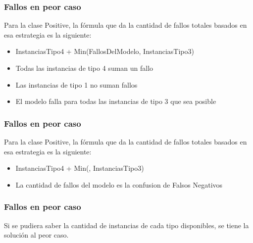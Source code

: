 \begin{frame}[t]
\frametitle{Fallos en peor caso}
\vspace{6mm}
Para la clase Positive, la f\'ormula que da la cantidad de fallos totales basados en esa estrategia es la siguiente:
\vspace{3mm}
\begin{itemize}
    \item InstanciasTipo4 + Min(FallosDelModelo, InstanciasTipo3)
\end{itemize}
\vspace{3mm}
\begin{itemize}
    \item Todas las instancias de tipo 4 suman un fallo
    \item Las instancias de tipo 1 no suman fallos
    \item El modelo falla para todas las instancias de tipo 3 que sea posible
\end{itemize}
\end{frame}



\begin{frame}[t]
\frametitle{Fallos en peor caso}
\vspace{6mm}
Para la clase Positive, la f\'ormula que da la cantidad de fallos totales basados en esa estrategia es la siguiente:
\vspace{3mm}
\begin{itemize}
    \item InstanciasTipo4 + Min(\MFN, InstanciasTipo3)
\end{itemize}
\vspace{3mm}
\begin{itemize}
\item La cantidad de fallos del modelo es la confusion de Falsos Negativos
\end{itemize}
\end{frame}



\begin{frame}
\frametitle{Fallos en peor caso}
Si se pudiera saber la cantidad de instancias de cada tipo disponibles, se tiene la soluci\'on al peor caso. \\
\end{frame}



